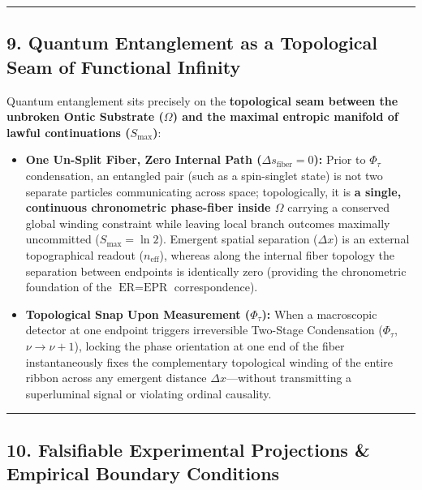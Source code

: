 \documentclass[
]{article}
\providecommand{\tightlist}{%
  \setlength{\itemsep}{0pt}\setlength{\parskip}{0pt}}
\begin{document}
\begin{center}\rule{0.5\linewidth}{0.5pt}\end{center}

\subsection{9. Quantum Entanglement as a Topological Seam of Functional
Infinity}\label{quantum-entanglement-as-a-topological-seam-of-functional-infinity}

Quantum entanglement sits precisely on the \textbf{topological seam
between the unbroken Ontic Substrate (\(\Omega\)) and the maximal
entropic manifold of lawful continuations (\(S_{\text{max}}\))}:

\begin{itemize}
\tightlist
\item
  \textbf{One Un-Split Fiber, Zero Internal Path
  (\(\Delta s_{\text{fiber}} = 0\)):} Prior to \(\Phi_\tau\)
  condensation, an entangled pair (such as a spin-singlet state) is not
  two separate particles communicating across space; topologically, it
  is \textbf{a single, continuous chronometric phase-fiber inside
  \(\Omega\)} carrying a conserved global winding constraint while
  leaving local branch outcomes maximally uncommitted
  (\(S_{\text{max}} = \ln 2\)). Emergent spatial separation
  (\(\Delta x\)) is an external topographical readout
  (\(n_{\text{eff}}\)), whereas along the internal fiber topology the
  separation between endpoints is identically zero (providing the
  chronometric foundation of the \(\text{ER} = \text{EPR}\)
  correspondence).
\item
  \textbf{Topological Snap Upon Measurement (\(\Phi_\tau\)):} When a
  macroscopic detector at one endpoint triggers irreversible Two-Stage
  Condensation (\(\Phi_\tau\), \(\nu \to \nu + 1\)), locking the phase
  orientation at one end of the fiber instantaneously fixes the
  complementary topological winding of the entire ribbon across any
  emergent distance \(\Delta x\)---without transmitting a superluminal
  signal or violating ordinal causality.
\end{itemize}

\begin{center}\rule{0.5\linewidth}{0.5pt}\end{center}

\subsection{10. Falsifiable Experimental Projections \& Empirical
Boundary
Conditions}\label{falsifiable-experimental-projections-empirical-boundary-conditions}
\end{document}
